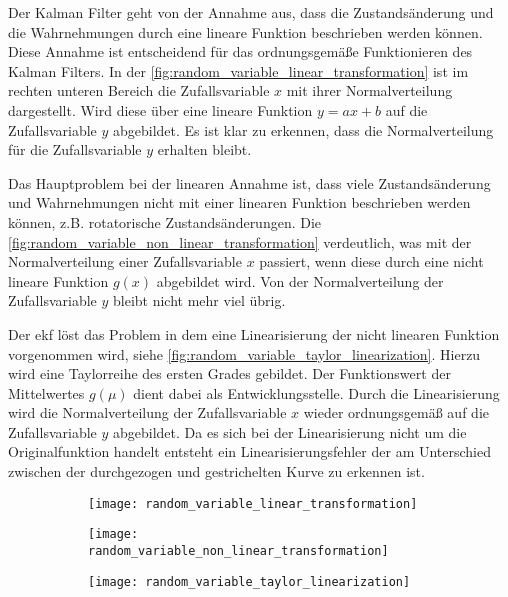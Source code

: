 Der Kalman Filter geht von der Annahme aus, dass die Zustandsänderung und die Wahrnehmungen durch eine lineare Funktion beschrieben werden können. Diese Annahme ist entscheidend für das ordnungsgemäße Funktionieren des Kalman Filters. In der \autoref{fig:random_variable_linear_transformation} ist im rechten unteren Bereich die Zufallsvariable $x$ mit ihrer Normalverteilung dargestellt. Wird diese über eine lineare Funktion $y=ax+b$ auf die Zufallsvariable $y$ abgebildet. Es ist klar zu erkennen, dass die Normalverteilung für die Zufallsvariable $y$ erhalten bleibt.

Das Hauptproblem bei der linearen Annahme ist, dass viele Zustandsänderung und Wahrnehmungen nicht mit einer linearen Funktion beschrieben werden können, z.B. rotatorische Zustandsänderungen. Die \autoref{fig:random_variable_non_linear_transformation} verdeutlich, was mit der Normalverteilung einer Zufallsvariable $x$ passiert, wenn diese durch eine nicht lineare Funktion $g(x)$ abgebildet wird. Von der Normalverteilung der Zufallsvariable $y$ bleibt nicht mehr viel übrig.

Der \Gls{ekf} löst das Problem in dem eine Linearisierung der nicht linearen Funktion vorgenommen wird, siehe \autoref{fig:random_variable_taylor_linearization}. Hierzu wird eine Taylorreihe des ersten Grades gebildet. Der Funktionswert der Mittelwertes $g(\mu)$ dient dabei als Entwicklungsstelle. Durch die Linearisierung wird die Normalverteilung der Zufallsvariable $x$ wieder ordnungsgemäß auf die Zufallsvariable $y$ abgebildet. Da es sich bei der Linearisierung nicht um die Originalfunktion handelt entsteht ein Linearisierungsfehler der am Unterschied zwischen der durchgezogen und gestrichelten Kurve zu erkennen ist.

\begin{figure}
	\centering
	\begin{subfigure}{0.49\linewidth}
		\centering
		\texttt{[image: random\_variable\_linear\_transformation]}
		\caption{}
		\label{fig:random_variable_linear_transformation}
	\end{subfigure}
	\hfill
	\begin{subfigure}{0.49\linewidth}
		\centering
		\texttt{[image: random\_variable\_non\_linear\_transformation]}
		\caption{}
		\label{fig:random_variable_non_linear_transformation}
	\end{subfigure}
	\par
	\bigskip
	\begin{subfigure}{0.49\linewidth}
		\centering
		\texttt{[image: random\_variable\_taylor\_linearization]}
		\caption{}
		\label{fig:random_variable_taylor_linearization}
	\end{subfigure}
	\label{fig:random_variable_transformation}
\end{figure}


